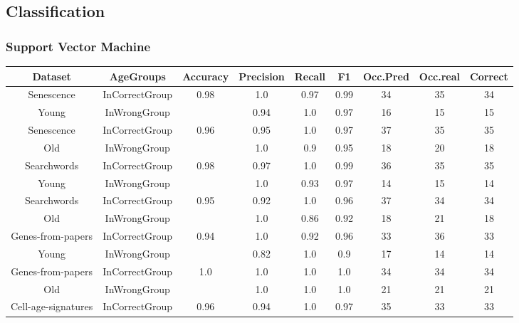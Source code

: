 \subsection*{Classification}
\subsubsection*{Support Vector Machine}
\begin{table}[H]
	\centering
	\small
	\begin{tabular}{|c|c|c|c|c|c|c|c|c|}
		\hline
		\textbf{Dataset} & \textbf{AgeGroups} & \textbf{Accuracy} & \textbf{Precision} & \textbf{Recall} & \textbf{F1} & \textbf{Occ.Pred} & \textbf{Occ.real} & \textbf{Correct} \\ \hline
		\rowcolor{gray!20}
		Senescence & InCorrectGroup & 0.98 & 1.0 & 0.97 & 0.99 & 34 & 35 & 34 \\
		\rowcolor{gray!20}
		Young & InWrongGroup &   & 0.94 & 1.0 & 0.97 & 16 & 15 & 15 \\
		\hline
		\rowcolor{gray!20}
		Senescence & InCorrectGroup & 0.96 & 0.95 & 1.0 & 0.97 & 37 & 35 & 35 \\
		\rowcolor{gray!20}
		Old & InWrongGroup &   & 1.0 & 0.9 & 0.95 & 18 & 20 & 18 \\
		\hline
		\hline
		Searchwords & InCorrectGroup & 0.98 & 0.97 & 1.0 & 0.99 & 36 & 35 & 35 \\
		Young & InWrongGroup &   & 1.0 & 0.93 & 0.97 & 14 & 15 & 14 \\
		\hline
		Searchwords & InCorrectGroup & 0.95 & 0.92 & 1.0 & 0.96 & 37 & 34 & 34 \\
		Old & InWrongGroup &   & 1.0 & 0.86 & 0.92 & 18 & 21 & 18 \\
		\hline
		\hline
		\rowcolor{gray!20}
		Genes-from-papers & InCorrectGroup & 0.94 & 1.0 & 0.92 & 0.96 & 33 & 36 & 33 \\
		\rowcolor{gray!20}
		Young & InWrongGroup &   & 0.82 & 1.0 & 0.9 & 17 & 14 & 14 \\
		\hline
		\rowcolor{gray!20}
		Genes-from-papers & InCorrectGroup & 1.0 & 1.0 & 1.0 & 1.0 & 34 & 34 & 34 \\
		\rowcolor{gray!20}
		Old & InWrongGroup &   & 1.0 & 1.0 & 1.0 & 21 & 21 & 21 \\
		\hline
		\hline
		Cell-age-signatures & InCorrectGroup & 0.96 & 0.94 & 1.0 & 0.97 & 35 & 33 & 33 \\

\end{tabular}
\end{table}
